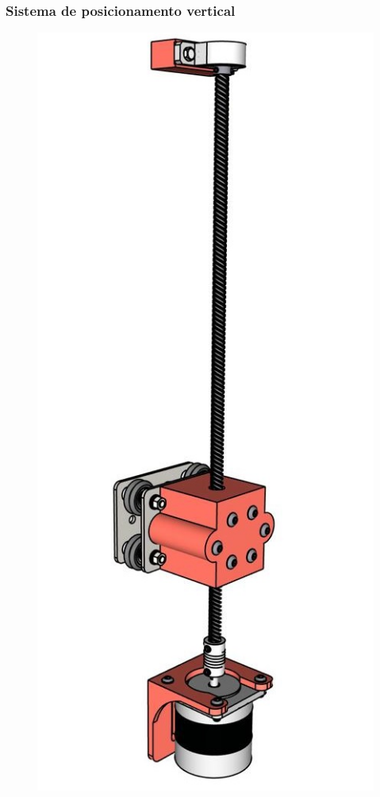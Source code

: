 \begin{frame}
    \frametitle{Sistema de posicionamento vertical}  
        \begin{figure}
            \centering
            \includegraphics[scale = 0.18]{figuras/sistemaelevacao}
        \end{figure}
\end{frame}

